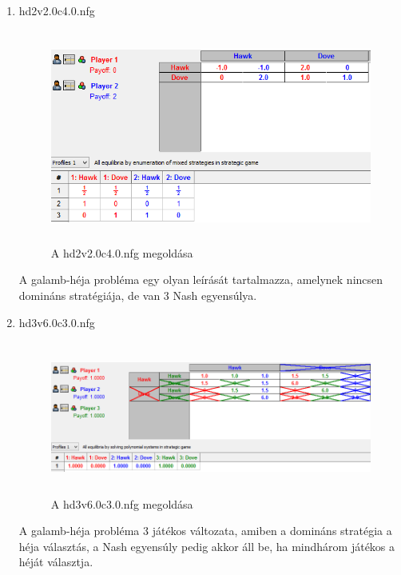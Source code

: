 \begin{enumerate}
\item hd2v2.0c4.0.nfg
		\begin{figure}[!h]
		\begin{center}
		\includegraphics[height=7cm]{figures/hd2v2.png}
		\caption{A hd2v2.0c4.0.nfg megoldása}
		\end{center}
		\end{figure}
A galamb-héja probléma egy olyan leírását tartalmazza, amelynek nincsen domináns stratégiája, de van 3 Nash egyensúlya.
		
\item hd3v6.0c3.0.nfg
		\begin{figure}[!h]
		\begin{center}
		\includegraphics[height=5cm]{figures/hd3_dom.png}
		\caption{A hd3v6.0c3.0.nfg megoldása}
		\end{center}
		\end{figure}
A galamb-héja probléma 3 játékos változata, amiben a domináns stratégia a héja választás, a Nash egyensúly pedig akkor áll be, ha mindhárom játékos a héját választja.


\end{enumerate}
